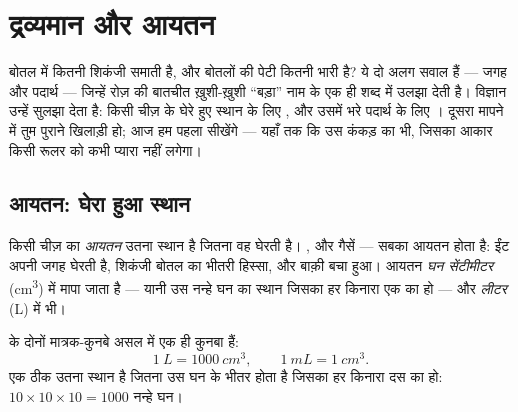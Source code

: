 \chapter{द्रव्यमान और आयतन}\label{ch:g6:mass-and-volume}

बोतल में कितनी शिकंजी समाती है, और बोतलों की पेटी कितनी भारी है? ये
दो अलग सवाल हैं --- जगह और पदार्थ --- जिन्हें रोज़ की बातचीत ख़ुशी-ख़ुशी
``बड़ा'' नाम के एक ही शब्द में उलझा देती है। विज्ञान उन्हें सुलझा देता
है: किसी चीज़ के घेरे हुए स्थान के लिए , और उसमें भरे पदार्थ के
लिए । दूसरा मापने में तुम पुराने खिलाड़ी हो; आज हम पहला 
सीखेंगे --- यहाँ तक कि उस कंकड़ का भी, जिसका आकार किसी रूलर को कभी
प्यारा नहीं लगेगा।

\section{आयतन: घेरा हुआ स्थान}

\begin{definition}[आयतन]\label{def:g6:mass-and-volume:volume}
किसी चीज़ का \emph{आयतन} उतना स्थान है जितना वह घेरती है।
,  और गैसें --- सबका आयतन होता है: ईंट अपनी जगह घेरती है,
शिकंजी बोतल का भीतरी हिस्सा, और  बाक़ी बचा हुआ। आयतन \emph{घन
सेंटीमीटर} (\unit{cm^3}) में मापा जाता है ---
यानी उस नन्हे घन का स्थान जिसका हर किनारा एक  का हो --- और
\emph{लीटर} (\unit{L}) में भी।
\end{definition}

\begin{proposition}[घनों में लीटर]\label{prop:g6:mass-and-volume:litre}
 के दोनों मात्रक-कुनबे असल में एक ही कुनबा हैं:
\[
\qty{1}{L} = \qty{1000}{cm^3},
\qquad
\qty{1}{mL} = \qty{1}{cm^3}.
\]
एक  ठीक उतना स्थान है जितना उस घन के भीतर होता है जिसका हर किनारा
दस  का हो: $10 \times 10 \times 10 = 1000$ नन्हे घन।
\end{proposition}

